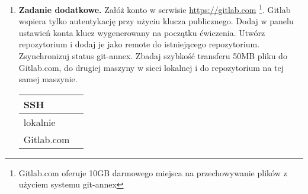 \documentclass[polish]{article}
\begin{document}
\begin{enumerate}
    \item
    \textbf{Zadanie dodatkowe.} Załóż konto w serwisie
    \href{https://gitlab.com}{https://gitlab.com}
    \footnote{Gitlab.com oferuje 10GB darmowego miejsca na przechowywanie
    plików z użyciem systemu git-annex}.
    Gitlab wspiera tylko autentykację przy użyciu klucza publicznego. Dodaj
    w panelu ustawień konta klucz wygenerowany na początku ćwiczenia.
    Utwórz repozytorium i dodaj je jako remote do istniejącego repozytorium.
    Zsynchronizuj status git-annex. Zbadaj szybkość transferu 50MB pliku do
    Gitlab.com, do drugiej maszyny w sieci lokalnej i do repozytorium na tej
    samej maszynie.

    \begin{tabular}{|l|p{}|}
    \hline
    SSH & \\
    \hline
    lokalnie & \\
    \hline
    Gitlab.com & \\
    \hline
    \end{tabular}

\end{enumerate}
\end{document}
